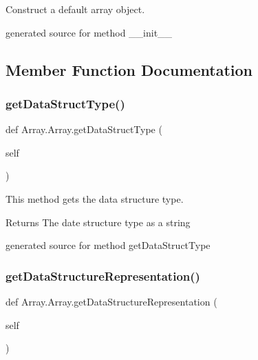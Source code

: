 Construct a default array object. 

\begin{DoxyVerb}generated source for method __init__ \end{DoxyVerb}
 

\subsection{Member Function Documentation}
\hypertarget{class_array_1_1_array_a4cfe6b173521a8df7448e0b87209fe52}{}\label{class_array_1_1_array_a4cfe6b173521a8df7448e0b87209fe52} 
\subsubsection{\texorpdfstring{get\+Data\+Struct\+Type()}{getDataStructType()}}
{\footnotesize\ttfamily def Array.\+Array.\+get\+Data\+Struct\+Type (\begin{DoxyParamCaption}\item[{}]{self }\end{DoxyParamCaption})}



This method gets the data structure type. 

\begin{DoxyReturn}{Returns}
The date structure type as a string\begin{DoxyVerb}generated source for method getDataStructType \end{DoxyVerb}
 
\end{DoxyReturn}
\hypertarget{class_array_1_1_array_a969daf81cbb75062c5d1313f5a63688a}{}\label{class_array_1_1_array_a969daf81cbb75062c5d1313f5a63688a} 
\subsubsection{\texorpdfstring{get\+Data\+Structure\+Representation()}{getDataStructureRepresentation()}}
{\footnotesize\ttfamily def Array.\+Array.\+get\+Data\+Structure\+Representation (\begin{DoxyParamCaption}\item[{}]{self }\end{DoxyParamCaption})}



